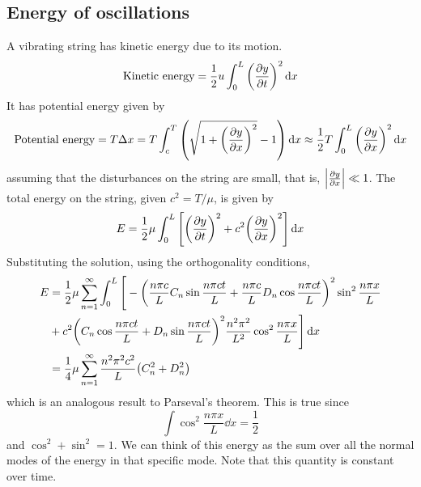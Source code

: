 \subsection{Energy of oscillations}
A vibrating string has kinetic energy due to its motion.
\[
	\text{Kinetic energy} = \frac{1}{2}u \int_0^L \qty(\pdv{y}{t})^2 \dd{x}
\]
It has potential energy given by
\[
	\text{Potential energy} = T \Delta x = T \int_c^T \qty(\sqrt{1 + \qty(\pdv{y}{x})^2}-1)\dd{x} \approx \frac{1}{2} T \int_0^L \qty(\pdv{y}{x})^2 \dd{x}
\]
assuming that the disturbances on the string are small, that is, \( \abs{\pdv{y}{x}} \ll 1 \).
The total energy on the string, given \( c^2 = T/\mu \), is given by
\[
	E = \frac{1}{2}\mu \int_0^L \qty[\qty(\pdv{y}{t})^2 + c^2 \qty(\pdv{y}{x})^2] \dd{x}
\]
Substituting the solution, using the orthogonality conditions,
\begin{align*}
	E & = \frac{1}{2}\mu \sum_{n=1}^\infty \int_0^L \Bigg[-\qty(\frac{n \pi c}{L} C_n \sin \frac{n \pi c t}{L} + \frac{n \pi c}{L} D_n \cos \frac{n \pi c t}{L})^2 \sin^2 \frac{n \pi x}{L} \\
	  & + c^2 \qty(C_n \cos \frac{n \pi c t}{L} + D_n \sin \frac{n \pi c t}{L})^2 \frac{n^2 \pi^2}{L^2} \cos^2 \frac{n \pi x}{L} \Bigg] \dd{x}                                              \\
	  & = \frac{1}{4} \mu \sum_{n=1}^\infty \frac{n^2 \pi^2 c^2}{L} \qty(C_n^2 + D_n^2)
\end{align*}
which is an analogous result to Parseval's theorem.
This is true since \[
	\int \cos^2 \frac{n \pi x}{L}\dd{x} = \frac{1}{2}
\] and \( \cos^2 + \sin^2 = 1 \).
We can think of this energy as the sum over all the normal modes of the energy in that specific mode.
Note that this quantity is constant over time.


